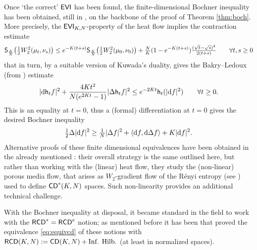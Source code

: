 \documentclass[11pt]{article}
\numberwithin{equation}{section}
\newcommand{\CD}{{\sf CD}}
\newcommand{\RCD}{{\sf RCD}}
\renewcommand{\d}{{\rm d}}
\newcommand{\h}{{\sf h}} %
\newcommand\la{\langle}
\newcommand\ra{\rangle}
\newcommand{\EVI}{{\sf EVI}}
\begin{document}
{{Once `the correct' $\EVI$ has been found, the finite-dimensional Bochner inequality has been obtained, still in \cite{Erbar-Kuwada-Sturm13}, on the backbone of the proof of Theorem \ref{thm:boch}. More precisely, the $\EVI_{K,N}$-property of the heat flow implies the contraction estimate
\[
{\sf S}_{\frac  KN}\big(\tfrac12W_2^2(\mu_t,\nu_s)\big)\leq e^{-K(t+s)}{\sf S}_{\frac  KN}\big(\tfrac12W_2^2(\mu_0,\nu_0)\big)+\tfrac NK(1-e^{-K(t+s)})\tfrac{(\sqrt t-\sqrt s)^2}{2(t+s)}\qquad\forall t,s\geq 0
\]
that in turn, by a suitable version of Kuwada's duality, gives the Bakry–Ledoux (from \cite{BaLe06}) estimate
\begin{equation}
\label{eq:BL}
|\d\h_tf|^2+\frac{4Kt^2}{N(e^{2Kt}-1)}|\Delta\h_tf|^2\leq e^{-2Kt}\h_t(|\d f|^2)\qquad\forall t\geq 0.
\end{equation}
This is an equality at $t=0$, thus a (formal) differentiation at $t=0$ gives the desired  Bochner inequality
\begin{equation}
\label{eq:bochfindim}
\tfrac12\Delta |\d f|^2 \geq \tfrac1N |\Delta f|^2 +\la \d f,\d\Delta f\ra +K|\d f|^2.
\end{equation}
Alternative proofs of   these finite dimensional equivalences  have been obtained in the already mentioned \cite{AmbrosioMondinoSavare13}: their overall strategy is the same outlined here, but rather than working with the (linear) heat flow, they study  the (non-linear) porous media flow, that arises as $W_2$-gradient flow of the R\'enyi entropy (see \cite{Otto01}) used to define $\CD^*(K,N)$ spaces. Such non-linearity provides an additional technical challenge. 

With the Bochner inequality at disposal, it became standard in the field to work with the $\RCD^*=\RCD^e$ notion; as mentioned before it has been  \cite{CavMil16} that proved the equivalence \eqref{eq:equivcd} of these notions with $\RCD(K,N):=\CD(K,N)+\text{Inf. Hilb.}$ (at least in normalized spaces).


\medskip


}}
\end{document}
